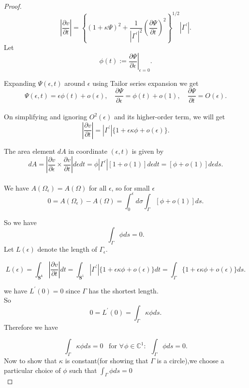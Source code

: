 \documentclass[oneside]{book}
\begin{document}
\begin{proof}
		$$\left|\frac{\partial v}{\partial t}\right|=\left\{(1+\kappa \Psi)^{2}+\frac{1}{\left|\Gamma^{\prime}\right|^{2}}\left(\frac{\partial \Psi}{\partial t}\right)^{2}\right\}^{1 / 2}\left|\Gamma^{\prime}\right|.$$
		Let   
		$$\phi(t):=\left.\frac{\partial \Psi}{\partial \epsilon}\right|_{\epsilon=0}.$$ 
		
		Expanding $\Psi(\epsilon, t)$ around $\epsilon$ using Tailor series expansion we get \\
		
		$$
		\Psi(\epsilon, t)=\epsilon \phi(t)+o(\epsilon), \quad \frac{\partial \Psi}{\partial \epsilon}=\phi(t)+o(1), \quad \frac{\partial \Psi}{\partial t}=O(\epsilon).
		$$ \\
		On simplifying and ignoring $O^2(\epsilon)$ and its higher-order term, we will get 
		$$
		\left|\frac{\partial v}{\partial t}\right|=\left|\Gamma^{\prime}\right|\{1+\epsilon \kappa \phi+o(\epsilon)\}.
		$$ 
		
		The area element $d A$ in coordinate $( \epsilon, t)$   is given by
		\\
		\begin{equation}
		\label{eq13}  
		d A=\left|\frac{\partial v}{\partial \epsilon} \times \frac{\partial v}{\partial t}\right| d \epsilon dt=\phi\left|\Gamma^{\prime}\right|[1+o(1)] d \epsilon d t=[\phi+o(1)] d \epsilon d s.
		\end{equation} \\
		We have $A\left(\Omega_{\epsilon}\right)=A(\Omega)$ for all $\epsilon$, so for small $\epsilon$ \\
		
		$$
		0 = A\left(\Omega_{\epsilon}\right)-A(\Omega)=\int_{0}^{\epsilon} d \sigma \int_{\Gamma}[\phi+o(1)] d s.
		$$
		
		So we have 
		$$  
		\int_{\Gamma} \phi d s=0.
		$$ 
		Let $L(\epsilon)$ denote the length of $\Gamma_{\epsilon} .$  
		
		
		
		$$ L(\epsilon)=\int_{\mathbf{S^1}}\left|\frac{\partial v}{\partial t}\right| d t=\int_{\mathbf{S}^{1}}\left|\Gamma^{\prime}\right|\{1+\epsilon \kappa \phi+o(\epsilon)\} d t=\int_{\Gamma}\{1+\epsilon \kappa \phi+o(\epsilon)\} d s. $$
		
		\hfill \break
		
		we have $L^{\prime}(0)=0$ since $\Gamma$ has the shortest length.
		\\
		So
		$$ 0 = L^{\prime}(0)=\int_{\Gamma} \kappa \phi d s.$$
		Therefore we have 
		
		
		\begin{equation}
		\label{eq:13.5}
		\int_{\Gamma} \kappa  \phi d s=0  \hspace{6pt}   \text{ for } \forall \hspace{1pt}  \phi \in \mathbb{C}^{1} : \hspace{6pt}         \int_{\Gamma} \phi d s=0.
		\end{equation}
		Now to show that $\kappa$ is constant(for showing that $\Gamma$ is a circle),we choose a\\ particular choice of $\phi$ such that $ \int_{\Gamma} \phi d s=0$
		\\
		

\end{proof}
\end{document}
